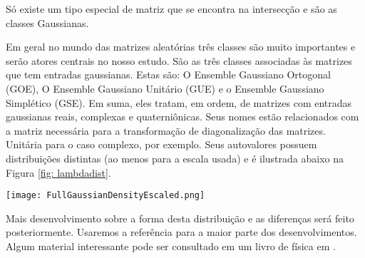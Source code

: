 Só existe um tipo especial de matriz que se encontra na intersecção e são as classes Gaussianas.

Em geral no mundo das matrizes aleatórias três classes são muito importantes e serão atores centrais no nosso estudo. São as três classes associadas às matrizes que tem entradas gaussianas. Estas são: O Ensemble Gaussiano Ortogonal (GOE), O Ensemble Gaussiano Unitário (GUE) e o Ensemble Gaussiano Simplético (GSE). Em suma, eles tratam, em ordem, de matrizes com entradas gaussianas reais, complexas e quaterniônicas. Seus nomes estão relacionados com a matriz necessária para a transformação de diagonalização das matrizes. Unitária para o caso complexo, por exemplo. Seus autovalores possuem distribuições distintas (ao menos para a escala usada) e é ilustrada abaixo na Figura \eqref{fig: lambdadist}.

\begin{center}
	\texttt{[image: FullGaussianDensityEscaled.png]}
	\label{fig: lambdadist}
\end{center}

Mais desenvolvimento sobre a forma desta distribuição e as diferenças será feito posteriormente. Usaremos a referência \cite{Livan_2018} para a maior parte dos desenvolvimentos. Algum material interessante pode ser consultado em um livro de física em \cite{MEHTA1967v}.